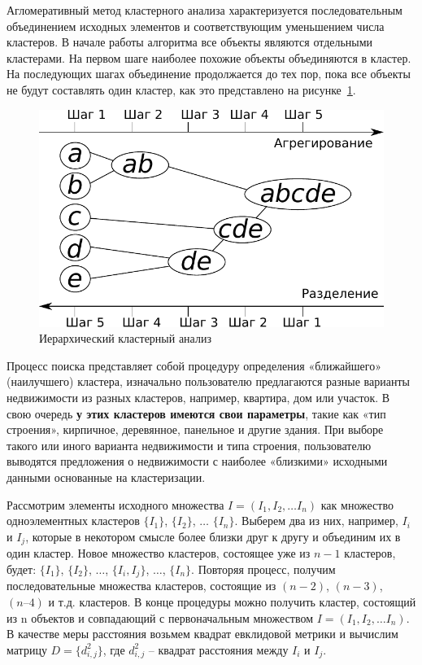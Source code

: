 \documentclass[a4paper,14pt,openany,final]{extreport} %
\def\oldcaption{} \let\oldcaption=\caption
\def\caption{\stepcounter{captionsnum}\oldcaption}
\begin{document}
{Агломеративный метод кластерного анализа характеризуется последовательным объединением исходных элементов и соответствующим уменьшением числа кластеров. В начале работы алгоритма все объекты являются отдельными кластерами. На первом шаге наиболее похожие объекты объединяются в кластер. На последующих шагах объединение продолжается до тех пор, пока все объекты не будут составлять один кластер, как это представлено на рисунке~\ref{fig:hclustdescr}.

\begin{figure}[htbp]
  \centering
  \includegraphics[width=0.5\linewidth]{hclustexp.pdf}
  \caption{Иерархический кластерный анализ}
  \label{fig:hclustdescr}
\end{figure}


Процесс поиска представляет собой процедуру определения «ближайшего» (наилучшего) кластера, изначально пользователю предлагаются разные варианты недвижимости из разных кластеров, например, квартира, дом или участок. В свою очередь\textbf{ у этих кластеров имеются свои параметры}, такие как «тип строения», кирпичное, деревянное, панельное и другие здания. При выборе такого или иного варианта недвижимости и типа строения, пользователю выводятся предложения о недвижимости с наиболее «близкими» исходными данными основанные на кластеризации.

Рассмотрим элементы исходного множества $Ι = (Ι_1, Ι_2, \ldots Ι_n)$ как множество одноэлементных кластеров $\{Ι_1\}$, $\{Ι_2\}$, $\ldots$ $\{Ι_n\}$. Выберем два из них, например, $Ι_i$ и $Ι_j$, которые в некотором смысле более близки друг к другу и объединим их в один кластер. Новое множество кластеров, состоящее уже из $n-1$ кластеров, будет: $\{Ι_1\}$, $\{Ι_2\}$, $\ldots$, $\{Ι_i , Ι_j\}$, $\ldots$, $\{Ι_n\}$. Повторяя процесс, получим последовательные множества кластеров, состоящие из $(n-2)$, $(n-3)$, $(n–4)$ и т.д. кластеров. В конце процедуры можно получить кластер, состоящий из n объектов и совпадающий с первоначальным множеством $Ι = (Ι_1, Ι_2, \ldots Ι_n)$. В качестве меры расстояния возьмем квадрат евклидовой метрики и вычислим матрицу $D= \{d_{i,j}^2 \}$, где $d_{i,j}^2$ -- квадрат расстояния между $Ι_i$ и $Ι_j$.

}
\end{document}
